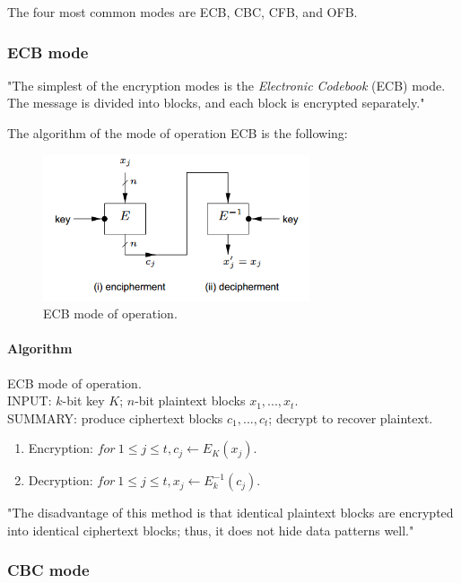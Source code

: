 \documentclass[a4paper,12pt,titlepage]{article}
\begin{document}
The four most common modes are ECB, CBC, CFB, and OFB. 

\subsubsection{ECB mode}

"The simplest of the encryption modes is the \textit{Electronic Codebook} (ECB) mode. The message is divided into blocks, and each block is encrypted separately." \citep{wiki:mode-operation}

The algorithm of the mode of operation ECB is the following:

\begin{figure}[!ht]
	\centering
	\label{fig:ecb}
	\includegraphics[width=0.7\textwidth]{ecb.png}
	\caption{ECB mode of operation. \citep{menezes_handbook_1996}}
\end{figure}

\paragraph{Algorithm}
ECB mode of operation. \citep{menezes_handbook_1996} \\
INPUT: $k$-bit key $K$; $n$-bit plaintext blocks $x_1, ... , x_t$. \\
SUMMARY: produce ciphertext blocks $c_1, ... , c_t$; decrypt to recover plaintext.
\begin{enumerate}[noitemsep]
\item Encryption: $for\ 1 \le j \le t, c_j \leftarrow E_K(x_j)$.
\item Decryption: $for\ 1 \le j \le t, x_j \leftarrow E_k^{-1}(c_j)$.
\end{enumerate}

"The disadvantage of this method is that identical plaintext blocks are encrypted into identical ciphertext blocks; thus, it does not hide data patterns well." \citep{wiki:mode-operation}

\subsubsection{CBC mode}
\end{document}
